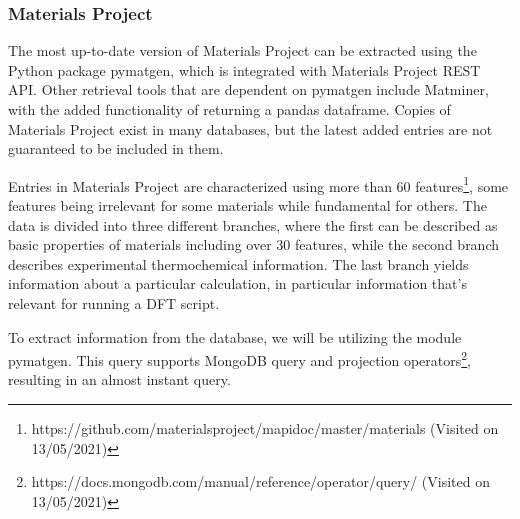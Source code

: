 

\subsubsection{Materials Project}
\label{ssec:materialsproject}

The most up-to-date version of Materials Project can be extracted using the Python package pymatgen, which is integrated with Materials Project REST API. Other retrieval tools that are dependent on pymatgen include Matminer, with the added functionality of returning a pandas dataframe. Copies of Materials Project exist in many databases, but the latest added entries are not guaranteed to be included in them. %

Entries in Materials Project are characterized using more than 60 features\footnote{https://github.com/materialsproject/mapidoc/master/materials (Visited on 13/05/2021)}, some features being irrelevant for some materials while fundamental for others. The data is divided into three different branches, where the first can be described as basic properties of materials including over $30$ features, while the second branch describes experimental thermochemical information. The last branch yields information about a particular calculation, in particular information that's relevant for running a DFT script.

To extract information from the database, we will be utilizing the module pymatgen. This query supports MongoDB query and projection operators\footnote{https://docs.mongodb.com/manual/reference/operator/query/ (Visited on 13/05/2021)}, resulting in an almost instant query.

